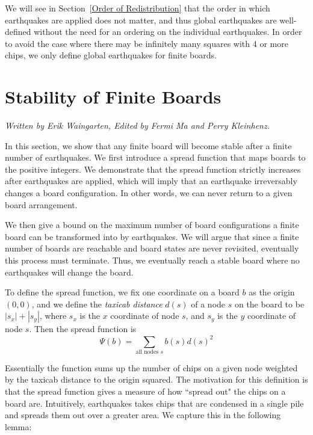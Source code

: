 \documentclass[runningheads,a4paper]{llncs}
\begin{document}
We will see in Section~\ref{Order of Redistribution} that the order in which earthquakes are applied does not matter, and thus global earthquakes are well-defined without the need for an ordering on the individual earthquakes. In order to avoid the case where there may be infinitely many squares with 4 or more chips, we only define global earthquakes for finite boards.

\section{Stability of Finite Boards}
\label{Stability of Finite Boards}
\emph{Written by Erik Waingarten, Edited by Fermi Ma and Perry Kleinhenz.}

In this section, we show that any finite board will become stable after a finite number of earthquakes. We first introduce a spread function that maps boards to the positive integers. We demonstrate that the spread function strictly increases after earthquakes are applied, which will imply that an earthquake irreversably changes a board configuration. In other words, we can never return to a given board arrangement.

We then give a bound on the maximum number of board configurations a finite board can be transformed into by earthquakes. We will argue that since a finite number of boards are reachable and board states are never revisited, eventually this process must terminate. Thus, we eventually reach a stable board where no earthquakes will change the board.

To define the spread function, we fix one coordinate on a board $b$ as the origin $(0,0)$, and we define the \emph{taxicab distance} $d(s)$ of a node $s$ on the board to be $|s_x| + |s_y|$, where $s_x$ is the $x$ coordinate of node $s$, and $s_y$ is the $y$ coordinate of node $s$. Then the spread function is
\begin{equation*}
\Psi(b) = \sum_{\text{all nodes }s}b(s)d(s)^2 
\end{equation*}

Essentially the function sums up the number of chips on a given node weighted by the taxicab distance to the origin squared. The motivation for this definition is that the spread function gives a measure of how ``spread out" the chips on a board are. Intuitively, earthquakes takes chips that are condensed in a single pile and spreads them out over a greater area. We capture this in the following lemma:
\end{document}

